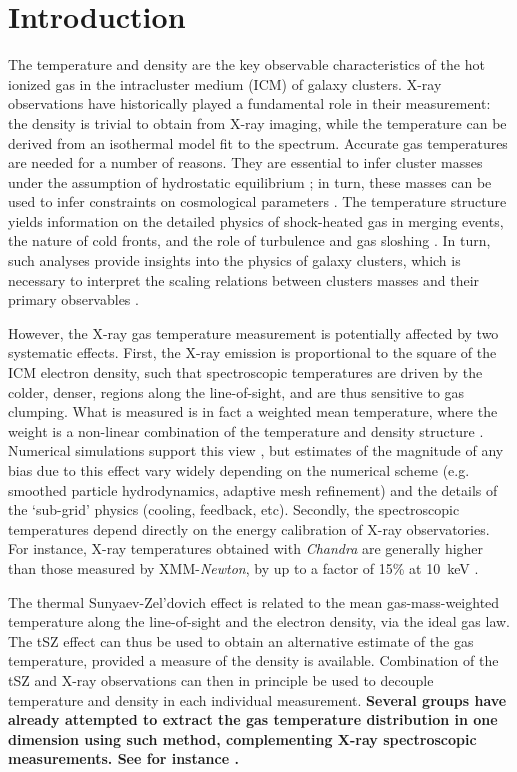 \documentclass[twocolumn,traditabstract]{aa}
\begin{document}
\section{Introduction}\label{sec:Introduction}
The temperature and density are the key observable characteristics of the hot ionized gas in the intracluster medium (ICM) of galaxy clusters. X-ray observations have historically played a fundamental role in their measurement: the density is trivial to obtain from X-ray imaging, while the temperature can be derived from an isothermal model fit to the spectrum. Accurate gas temperatures are needed for a number of reasons. They are essential to infer cluster masses under the assumption of hydrostatic equilibrium \citep{Sarazin1988}; in turn, these masses can be used to infer constraints on cosmological parameters \citep[e.g.,][]{Allen2011}. The temperature structure yields information on the detailed physics of shock-heated gas in merging events, the nature of cold fronts, and the role of turbulence and gas sloshing \citep[see e.g.][for a review]{mar07}. In turn, such analyses provide insights into the physics of galaxy clusters, which is necessary to interpret the scaling relations between clusters masses and their primary observables \citep{Khedekar2013}.

However, the X-ray gas temperature measurement is potentially affected by two systematic effects. First, the X-ray emission is proportional to the square of the ICM electron density, such that spectroscopic temperatures are driven by the colder,  denser, regions along the line-of-sight, and are thus sensitive to gas clumping. What is measured is in fact a weighted mean temperature, where the weight is a non-linear combination of the temperature and density structure \citep[see e.g.][]{maz04,vik06b}. Numerical simulations support this view \citep[e.g.][]{Nagai2007,ras14}, but estimates of the magnitude of any bias due to this effect vary widely depending on the numerical scheme (e.g. smoothed particle hydrodynamics, adaptive mesh refinement) and the details  of the `sub-grid' physics (cooling, feedback, etc). Secondly, the spectroscopic temperatures depend directly on the energy calibration of X-ray observatories. For instance, X-ray temperatures obtained with  \textit{Chandra} are generally higher than those measured by XMM-\textit{Newton}, by up to a factor of 15\% at 10~keV \citep[e.g.,][]{Mahdavi2013}.

The thermal Sunyaev-Zel'dovich \citep[tSZ,][]{Sunyaev1972} effect is related to the mean gas-mass-weighted temperature along the line-of-sight and the electron density, via the ideal gas law. The tSZ effect can thus be used to obtain an alternative estimate of the gas temperature, provided a measure of the density is available. Combination of the tSZ and X-ray observations can then in principle be used to decouple temperature and density in each individual measurement. {\bf Several groups have already attempted to extract the gas temperature distribution in one dimension using such method, complementing X-ray spectroscopic measurements. See for instance \cite{Nord2009,Basu2010,Eckert2013,Ruppin2016}.}
\end{document}

